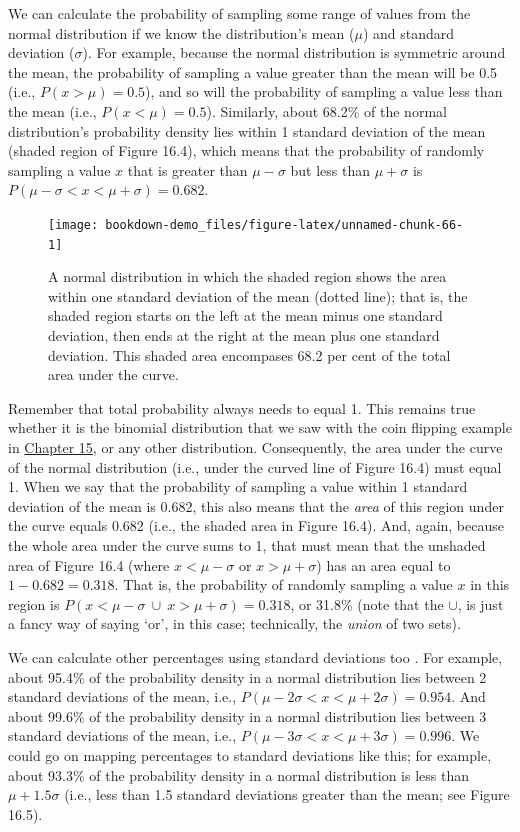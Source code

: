 \documentclass[
]{scrbook}
\begin{document}
We can calculate the probability of sampling some range of values from the normal distribution if we know the distribution's mean (\(\mu\)) and standard deviation (\(\sigma\)).
For example, because the normal distribution is symmetric around the mean, the probability of sampling a value greater than the mean will be 0.5 (i.e., \(P(x > \mu) = 0.5\)), and so will the probability of sampling a value less than the mean (i.e., \(P(x < \mu) = 0.5\)).
Similarly, about 68.2\% of the normal distribution's probability density lies within 1 standard deviation of the mean (shaded region of Figure 16.4), which means that the probability of randomly sampling a value \(x\) that is greater than \(\mu - \sigma\) but less than \(\mu + \sigma\) is \(P(\mu - \sigma < x < \mu + \sigma) = 0.682\).

\begin{figure}
\texttt{[image: bookdown-demo\_files/figure-latex/unnamed-chunk-66-1]} \caption{A normal distribution in which the shaded region shows the area within one standard deviation of the mean (dotted line); that is, the shaded region starts on the left at the mean minus one standard deviation, then ends at the right at the mean plus one standard deviation. This shaded area encompases 68.2 per cent of the total area under the curve.}\label{fig:unnamed-chunk-66}
\end{figure}

Remember that total probability always needs to equal 1.
This remains true whether it is the binomial distribution that we saw with the coin flipping example in \protect\hyperlink{Chapter_15}{Chapter 15}, or any other distribution.
Consequently, the area under the curve of the normal distribution (i.e., under the curved line of Figure 16.4) must equal 1.
When we say that the probability of sampling a value within 1 standard deviation of the mean is 0.682, this also means that the \emph{area} of this region under the curve equals 0.682 (i.e., the shaded area in Figure 16.4).
And, again, because the whole area under the curve sums to 1, that must mean that the unshaded area of Figure 16.4 (where \(x < \mu -\sigma\) or \(x > \mu + \sigma\)) has an area equal to \(1 - 0.682 = 0.318\).
That is, the probability of randomly sampling a value \(x\) in this region is \(P(x < \mu - \sigma \: \cup \: x > \mu + \sigma) = 0.318\), or 31.8\% (note that the \(\cup\), is just a fancy way of saying `or', in this case; technically, the \emph{union} of two sets).

We can calculate other percentages using standard deviations too \citep{Sokal1995}.
For example, about 95.4\% of the probability density in a normal distribution lies between 2 standard deviations of the mean, i.e., \(P(\mu - 2\sigma < x < \mu + 2\sigma) = 0.954\).
And about 99.6\% of the probability density in a normal distribution lies between 3 standard deviations of the mean, i.e., \(P(\mu - 3\sigma < x < \mu + 3\sigma) = 0.996\).
We could go on mapping percentages to standard deviations like this; for example, about 93.3\% of the probability density in a normal distribution is less than \(\mu + 1.5\sigma\) (i.e., less than 1.5 standard deviations greater than the mean; see Figure 16.5).
\end{document}

